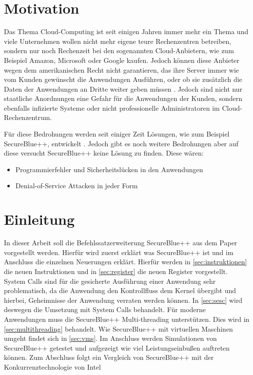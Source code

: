 \documentclass[ngerman]{sig-alternate-05-2015}
\begin{document}

\section{Motivation}
\label{sec:bedrohungsszenario} 
Das Thema Cloud-Computing ist seit einigen Jahren immer mehr ein Thema und viele Unternehmen wollen nicht mehr eigene teure Rechenzentren betreiben, sondern nur noch Rechenzeit bei den sogenannten Cloud-Anbietern, wie zum Beispiel Amazon, Microsoft oder Google kaufen. Jedoch können diese Anbieter wegen dem amerikanischen Recht nicht garantieren, das ihre Server immer wie vom Kunden gewünscht die Anwendungen Ausführen, oder ob sie zusätzlich die Daten der Anwendungen an Dritte weiter geben müssen \cite{poplak2013edward}. Jedoch sind nicht nur staatliche Anordnungen eine Gefahr für die Anwendungen der Kunden, sondern ebenfalls infizierte Systeme oder nicht professionelle Administratoren im Cloud-Rechenzentrum. 

Für diese Bedrohungen werden seit einiger Zeit Lösungen, wie zum Beispiel SecureBlue++, entwickelt \cite{evtyushkin2014iso}. Jedoch gibt es noch weitere Bedrohungen aber auf diese versucht SecureBlue++ keine Lösung zu finden. Diese wären:
\begin{itemize}
	\item Programmierfehler und Sicherheitslücken in den Anwendungen
	\item Denial-of-Service Attacken in jeder Form
\end{itemize}

\section{Einleitung}
In dieser Arbeit soll die Befehlssatzerweiterung SecureBlue++ aus dem Paper \cite{boivie2013secureblue++:big} vorgestellt werden. Hierfür wird zuerst erklärt was SecureBlue++ ist und im Anschluss die einzelnen Neuerungen erklärt. Hierfür werden in \cref{sec:instruktionen} die neuen Instruktionen und in \cref{sec:register} die neuen Register vorgestellt. System Calls sind für die gesicherte Ausführung einer Anwendung sehr problematisch, da die Anwendung den Kontrollfluss dem Kernel übergibt und hierbei, Geheimnisse der Anwendung verraten werden können. In \cref{sec:sesc} wird deswegen die Umsetzung mit System Calls behandelt. Für moderne Anwendungen muss die SecureBlue++ Multi-threading unterstützen. Dies wird in \cref{sec:multithreading} behandelt. Wie SecureBlue++ mit virtuellen Maschinen umgeht findet sich in \cref{sec:vms}. Im Anschluss werden Simulationen von SecureBlue++ getestet und aufgezeigt wie viel Leistungseinbußen auftreten können. Zum Abschluss folgt ein Vergleich von SecureBlue++ mit der Konkurrenztechnologie von Intel
\end{document}
